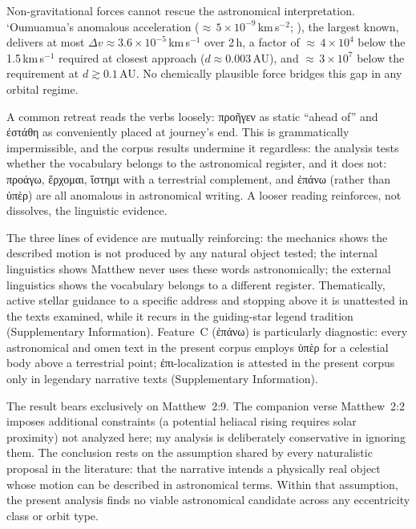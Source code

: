 \documentclass[sn-nature]{sn-jnl}
\newcommand{\grk}[1]{{\fontencoding{LGR}\selectfont #1}}
\newcommand{\grk}[1]{{\greekfont #1}}
\begin{document}
Non-gravitational forces cannot rescue the astronomical interpretation.
`Oumuamua's anomalous acceleration (${\approx}\,5\times10^{-9}$\,km\,s$^{-2}$;
\cite{micheli2018}), the largest known, delivers at most
$\Delta v \approx 3.6\times10^{-5}$\,km\,s$^{-1}$ over 2\,h, a factor of
${\approx}\,4\times10^4$ below the 1.5\,km\,s$^{-1}$ required at closest
approach ($d\approx0.003$\,AU), and ${\approx}\,3\times10^7$ below the
requirement at $d \gtrsim 0.1$\,AU. No chemically plausible force bridges
this gap in any orbital regime.

A common retreat reads the verbs loosely: \grk{προῆγεν} as static
``ahead of'' and \grk{ἐστάθη} as conveniently placed at journey's end.
This is grammatically impermissible\cite{adair2013star}, and the corpus
results undermine it regardless: the analysis tests whether the vocabulary
belongs to the astronomical register, and it does not: \grk{προάγω},
\grk{ἔρχομαι}, \grk{ἵστημι} with a terrestrial complement, and
\grk{ἐπάνω} (rather than \grk{ὑπὲρ}) are all anomalous in astronomical
writing. A looser reading reinforces, not dissolves, the linguistic evidence.

The three lines of evidence are mutually reinforcing: the mechanics shows the
described motion is not produced by any natural object tested; the internal linguistics shows Matthew never
uses these words astronomically; the external linguistics shows the vocabulary
belongs to a different register. Thematically, active stellar guidance to a
specific address and stopping above it is unattested in the texts examined,
while it recurs in the guiding-star legend tradition (Supplementary
Information). Feature~C (\grk{ἐπάνω}) is particularly diagnostic: every
astronomical and omen text in the present corpus employs \grk{ὑπὲρ} for a
celestial body above a terrestrial point; \grk{ἐπι}-localization is attested
in the present corpus only in legendary narrative texts (Supplementary
Information).

The result bears exclusively on Matthew~2:9. The companion verse Matthew~2:2
imposes additional constraints (a potential heliacal rising requires solar
proximity) not analyzed here; my analysis is
deliberately conservative in ignoring them. The conclusion rests on the
assumption shared by every naturalistic proposal in the literature: that the
narrative intends a physically real object whose motion can be described in
astronomical terms. Within that assumption, the present analysis finds no
viable astronomical candidate across any eccentricity class or orbit type.
\end{document}
